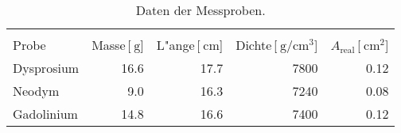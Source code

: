 
\begin{table}[!h]
\begin{center}
\begin{tabular}{|l|r|r|r|r|}
\hline
 & &&&\\
Probe & Masse\,[$\SI{}{\gram}$] & L"ange\,[$\SI{}{\centi\meter}$] & Dichte\,[$\SI{}{\gram\per\centi\meter^3}$] & $A_\mathrm{real}$\,[$\SI{}{\centi\meter^2}$]\\
\hline
\hline

Dysprosium & 16.6 & 17.7 & 7800 & 0.12\\
Neodym     & 9.0  & 16.3 & 7240 & 0.08\\
Gadolinium & 14.8 & 16.6 & 7400 & 0.12\\

\hline
\end{tabular}
\caption{Daten der Messproben.}
\label{daten}
\end{center}
\end{table}